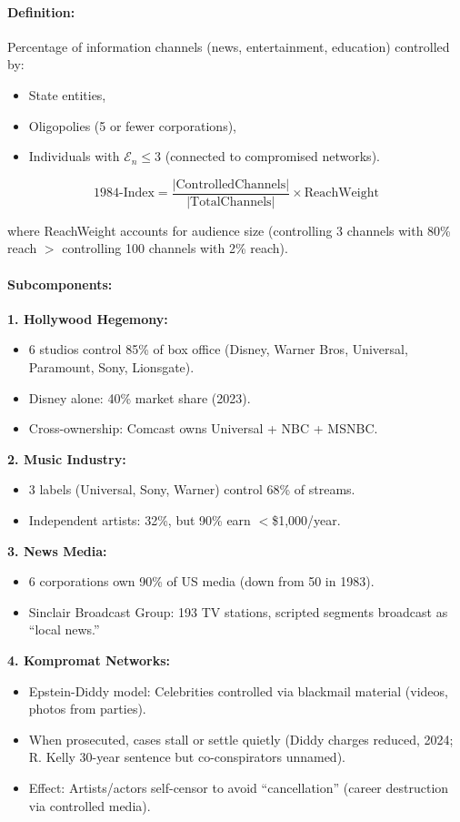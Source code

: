 \documentclass[11pt,a4paper]{article}
\theoremstyle{definition}
\theoremstyle{remark}
\begin{document}
\paragraph{Definition:}
Percentage of information channels (news, entertainment, education) controlled by:
\begin{itemize}
\item State entities,
\item Oligopolies (5 or fewer corporations),
\item Individuals with $\mathcal{E}_n \leq 3$ (connected to compromised networks).
\end{itemize}

\[
\text{1984-Index} = \frac{|\text{ControlledChannels}|}{|\text{TotalChannels}|} \times \text{ReachWeight}
\]

where ReachWeight accounts for audience size (controlling 3 channels with 80\% reach $>$ controlling 100 channels with 2\% reach).

\paragraph{Subcomponents:}

\textbf{1. Hollywood Hegemony:}
\begin{itemize}
\item 6 studios control 85\% of box office (Disney, Warner Bros, Universal, Paramount, Sony, Lionsgate).
\item Disney alone: 40\% market share (2023).
\item Cross-ownership: Comcast owns Universal + NBC + MSNBC.
\end{itemize}

\textbf{2. Music Industry:}
\begin{itemize}
\item 3 labels (Universal, Sony, Warner) control 68\% of streams.
\item Independent artists: 32\%, but 90\% earn $<$\$1,000/year.
\end{itemize}

\textbf{3. News Media:}
\begin{itemize}
\item 6 corporations own 90\% of US media (down from 50 in 1983).
\item Sinclair Broadcast Group: 193 TV stations, scripted segments broadcast as ``local news.''
\end{itemize}

\textbf{4. Kompromat Networks:}
\begin{itemize}
\item Epstein-Diddy model: Celebrities controlled via blackmail material (videos, photos from parties).
\item When prosecuted, cases stall or settle quietly (Diddy charges reduced, 2024; R. Kelly 30-year sentence but co-conspirators unnamed).
\item Effect: Artists/actors self-censor to avoid ``cancellation'' (career destruction via controlled media).
\end{itemize}
\end{document}
